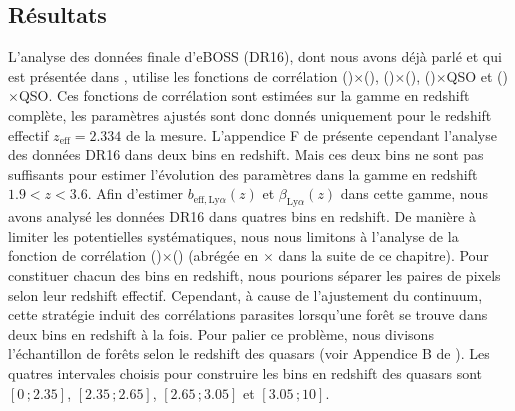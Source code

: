 \subsection{Résultats}
\label{subsec:data_ana}
L'analyse des données finale d'eBOSS (DR16), dont nous avons déjà parlé et qui est présentée dans \textcite{DuMasdesBourboux2020}, utilise les fonctions de corrélation \lya(\lya{})$\times$\lya{}(\lya{}), \lya{}(\lya{})$\times$\lya{}(\lyb{}), \lya{}(\lya{})$\times$QSO et \lya{}(\lyb{})$\times$QSO. Ces fonctions de corrélation sont estimées sur la gamme en redshift complète, les paramètres ajustés sont donc donnés uniquement pour le redshift effectif $z_{\mathrm{eff}} = \num{2.334}$ de la mesure. L'appendice F de \textcite{DuMasdesBourboux2020} présente cependant l'analyse des données DR16 dans deux bins en redshift. Mais ces deux bins ne sont pas suffisants pour estimer l'évolution des paramètres \lya{} dans la gamme en redshift $\num{1.9} < z  < \num{3.6}$.
Afin d'estimer $b_{\mathrm{eff},\mathrm{Ly}\alpha}(z)$ et $\beta_{\mathrm{Ly}\alpha}(z)$ dans cette gamme, nous avons analysé les données DR16 dans quatres bins en redshift. De manière à limiter les potentielles systématiques, nous nous limitons à l'analyse de la fonction de corrélation \lya{}(\lya{})$\times$\lya{}(\lya{}) (abrégée en \lya{}$\times$\lya{} dans la suite de ce chapitre).
Pour constituer chacun des bins en redshift, nous pourions séparer les paires de pixels selon leur redshift effectif. Cependant, à cause de l'ajustement du continuum, cette stratégie induit des corrélations parasites lorsqu'une forêt se trouve dans deux bins en redshift à la fois. Pour palier ce problème, nous divisons l'échantillon de forêts selon le redshift des quasars (voir Appendice B de \textcite{Agathe2019a}).
Les quatres intervales choisis pour construire les bins en redshift des quasars sont $[\num{0}\,;\num{2.35}]$, $[\num{2.35}\,;\num{2.65}]$, $[\num{2.65}\,;\num{3.05}]$ et $[\num{3.05}\,;\num{10}]$.
